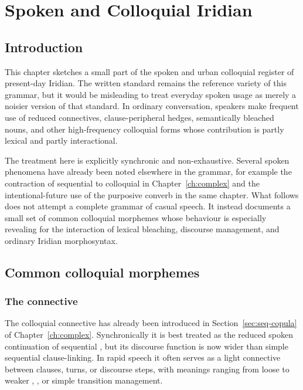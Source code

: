 \chapter{Spoken and Colloquial Iridian}\label{ch:spoken}

\section{Introduction}

This chapter sketches a small part of the spoken and urban colloquial register
of present-day Iridian. The written standard remains the reference variety of
this grammar, but it would be misleading to treat everyday spoken usage as
merely a noisier version of that standard. In ordinary conversation, speakers
make frequent use of reduced connectives, clause-peripheral hedges, semantically
bleached nouns, and other high-frequency colloquial forms whose contribution is
partly lexical and partly interactional.

The treatment here is explicitly synchronic and non-exhaustive. Several spoken
phenomena have already been noted elsewhere in the grammar, for example the
contraction of sequential  to colloquial  in
Chapter~\ref{ch:complex} and the intentional-future use of the purposive
converb in the same chapter. What follows does not attempt a complete grammar
of casual speech. It instead documents a small set of common colloquial
morphemes whose behaviour is especially revealing for the interaction of lexical
bleaching, discourse management, and ordinary Iridian morphosyntax.

\section{Common colloquial morphemes}\label{sec:spoken-morphemes}

\subsection{The connective }\label{sec:spoken-nu}

The colloquial connective  has already been introduced in
Section~\ref{sec:seq-copula} of Chapter~\ref{ch:complex}. Synchronically it is
best treated as the reduced spoken continuation of sequential , but
its discourse function is now wider than simple sequential clause-linking. In
rapid speech it often serves as a light connective between clauses, turns, or
discourse steps, with meanings ranging from loose  to weaker
, , or simple transition management.

